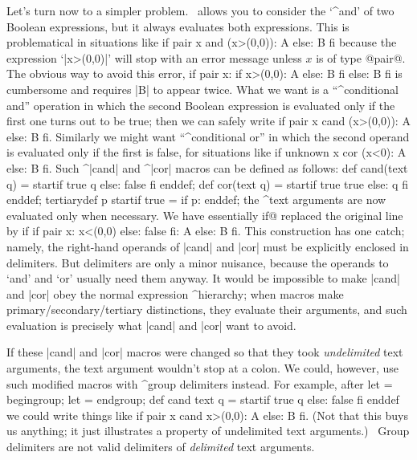 Let's turn now to a simpler problem. \MF\ allows you to consider the
`^{and}' of two Boolean expressions, but it always evaluates both
expressions. This is problematical in situations like
\begintt
if pair x and (x>(0,0)): A else: B fi
\endtt
because the expression `|x>(0,0)|' will stop with an error message
unless $x$ is of type @pair@. The obvious way to avoid this error,
\begintt
if pair x:  if x>(0,0): A else: B fi  else: B fi
\endtt
is cumbersome and requires |B| to appear twice.  What we want is a
``^{conditional and}'' operation in which the second Boolean expression is
evaluated only if the first one turns out to be true; then we can safely write
\begintt
if pair x cand (x>(0,0)): A else: B fi.
\endtt
Similarly we might want ``^{conditional or}'' in which the second operand is
evaluated only if the first is false, for situations like
\begintt
if unknown x cor (x<0): A else: B fi.
\endtt
Such ^|cand| and ^|cor| macros can be defined as follows:
\begintt
def cand(text q) = startif true q else: false fi enddef;
def cor(text q) = startif true true else: q fi enddef;
tertiarydef p startif true = if p: enddef;
\endtt
the ^{text arguments} are now evaluated only when necessary. We have essentially
^^@if@ replaced the original line by
\begintt
if if pair x: x<(0,0) else: false fi: A else: B fi.
\endtt
This construction has one catch; namely, the right-hand operands of |cand| and
|cor| must be explicitly enclosed in delimiters. But delimiters are only a
minor nuisance, because the operands to `and' and `or' usually need them
anyway. It would be impossible to make |cand| and |cor| obey the normal
expression ^{hierarchy}; when macros make primary/secondary/tertiary
distinctions, they evaluate their arguments, and such evaluation is
precisely what |cand| and |cor| want to avoid.

If these |cand| and |cor| macros were changed so that they took
{\sl undelimited\/} text arguments, the text argument wouldn't stop at a colon.
We could, however, use such modified macros with ^{group delimiters}
instead. For example, after
\begintt
let {{ = begingroup; let }} = endgroup;
def cand text q = startif true q else: false fi enddef
\endtt
we could write things like
\begintt
if {{pair x cand x>(0,0)}}: A else: B fi.
\endtt
(Not that this buys us anything; it just illustrates a property of
undelimited text arguments.) \ Group delimiters
are not valid delimiters of {\sl delimited\/} text arguments.

